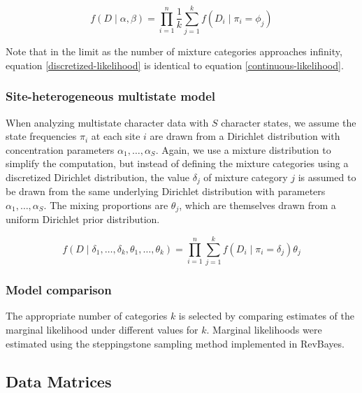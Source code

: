 \documentclass[]{article}
\begin{document}
\begin{equation} \label{discretized-likelihood}
f(D\mid \alpha,\beta) = \prod_{i=1}^n\frac{1}{k}\sum_{j=1}^k f(D_i \mid \pi_i = \phi_j)
\end{equation}

Note that in the limit as the number of mixture categories approaches infinity, equation \ref{discretized-likelihood} is identical to equation \ref{continuous-likelihood}.

\subsubsection{Site-heterogeneous multistate model}

When analyzing multistate character data with $S$ character states, we assume the state frequencies $\pi_i$ at each site $i$ are drawn from a Dirichlet distribution with concentration parameters $\alpha_1,\ldots,\alpha_S$.
Again, we use a mixture distribution to simplify the computation, but instead of defining the mixture categories using a discretized Dirichlet distribution, the value $\delta_j$ of mixture category $j$ is assumed to be drawn from the same underlying Dirichlet distribution with parameters $\alpha_1,\ldots,\alpha_S$.
The mixing proportions are $\theta_j$, which are themselves drawn from a uniform Dirichlet prior distribution.

$$f(D\mid \delta_1,\ldots,\delta_k,\theta_1,\ldots,\theta_k) = \prod_{i=1}^n \sum_{j=1}^k  f(D_i \mid \pi_i = \delta_j)\theta_j$$

\subsubsection{Model comparison}

The appropriate number of categories $k$ is selected by comparing estimates of the marginal likelihood under different values for $k$.
Marginal likelihoods were estimated using the steppingstone sampling method \citep{xie2010improving} implemented in RevBayes.

\subsection{Data Matrices}
\end{document}
